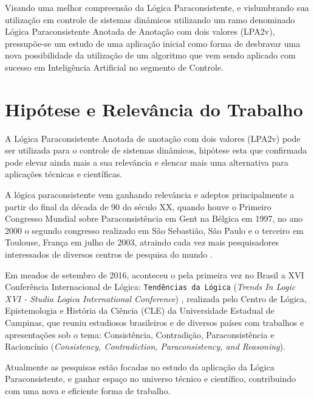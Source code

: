 Visando uma melhor compreensão da Lógica Paraconsistente, e vislumbrando sua utilização em controle de sistemas dinâmicos utilizando um ramo denominado Lógica Paraconsistente Anotada de Anotação com dois valores (LPA2v), pressupõe-se um estudo de uma aplicação inicial como forma de desbravar uma nova possibilidade da utilização de um algoritmo que vem sendo aplicado com sucesso em Inteligência Artificial no segmento de Controle.






\section{Hipótese e Relevância do Trabalho}
A Lógica Paraconsistente Anotada de anotação com dois valores (LPA2v) pode ser utilizada para o controle de sistemas dinâmicos, hipótese esta que confirmada pode elevar ainda mais a sua relevância e elencar mais uma alternativa para aplicações técnicas e científicas. 

A lógica paraconsistente vem ganhando relevância e adeptos principalmente a partir do final da década de 90 do século XX, quando houve o Primeiro Congresso Mundial sobre Paraconsistência em Gent na Bélgica em 1997, no ano 2000 o segundo congresso realizado em São Sebastião, São Paulo e o terceiro em Toulouse, França em julho de 2003, atraindo cada vez mais pesquisadores interessados de diversos centros de pesquisa do mundo \cite{DecioKrause}. 

Em meados de setembro de 2016, aconteceu o pela primeira vez no Brasil a XVI Conferência Internacional de Lógica: \texttt{Tendências da Lógica} (\emph{Trends In Logic XVI - Studia Logica International Conference}) \cite{trendsinlogic}, realizada pelo Centro de Lógica, Epistemologia e História da Ciência (CLE) da Universidade Estadual de Campinas, que reuniu estudiosos brasileiros e de diversos países com trabalhos e apresentações sob o tema: Consistência, Contradição, Paraconsistência e Racioncínio (\emph{Consistency, Contradiction, Paraconsistency, and Reasoning}).

Atualmente as pesquisas estão focadas no estudo da aplicação da Lógica Paraconsistente, e ganhar espaço no universo técnico e científico, contribuindo com uma nova e eficiente forma de trabalho.





